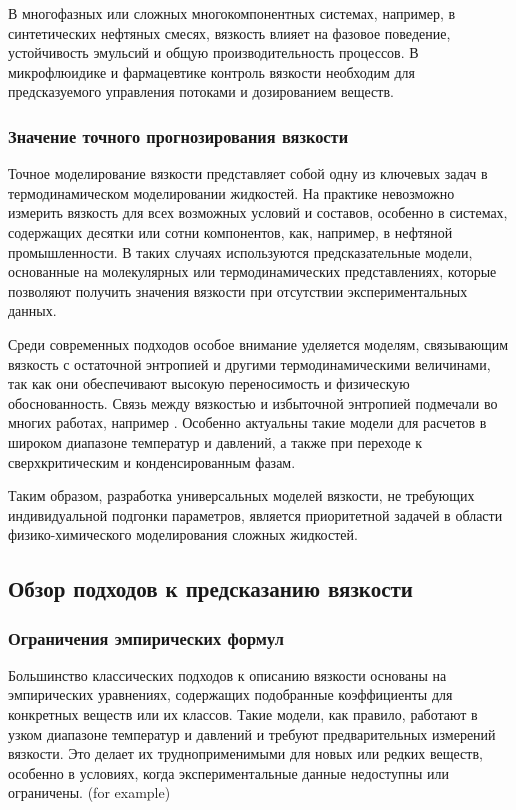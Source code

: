 \documentclass[a4paper,12pt]{article}
\begin{document}
В многофазных или сложных многокомпонентных системах, например, в синтетических нефтяных смесях, вязкость влияет на фазовое поведение, устойчивость эмульсий и общую производительность процессов. В микрофлюидике и фармацевтике контроль вязкости необходим для предсказуемого управления потоками и дозированием веществ.

    \subsubsection{Значение точного прогнозирования вязкости}

Точное моделирование вязкости представляет собой одну из ключевых задач в термодинамическом моделировании жидкостей. На практике невозможно измерить вязкость для всех возможных условий и составов, особенно в системах, содержащих десятки или сотни компонентов, как, например, в нефтяной промышленности. В таких случаях используются предсказательные модели, основанные на молекулярных или термодинамических представлениях, которые позволяют получить значения вязкости при отсутствии экспериментальных данных.

Среди современных подходов особое внимание уделяется моделям, связывающим вязкость с остаточной энтропией и другими термодинамическими величинами, так как они обеспечивают высокую переносимость и физическую обоснованность. Связь между вязкостью и избыточной энтропией подмечали во многих работах, например \cite{taib2020residual}. Особенно актуальны такие модели для расчетов в широком диапазоне температур и давлений, а также при переходе к сверхкритическим и конденсированным фазам.

Таким образом, разработка универсальных моделей вязкости, не требующих индивидуальной подгонки параметров, является приоритетной задачей в области физико-химического моделирования сложных жидкостей.

  \subsection{Обзор подходов к предсказанию вязкости}

    \subsubsection{Ограничения эмпирических формул}
      Большинство классических подходов к описанию вязкости основаны на эмпирических уравнениях, содержащих подобранные коэффициенты для конкретных веществ или их классов. Такие модели, как правило, работают в узком диапазоне температур и давлений и требуют предварительных измерений вязкости. Это делает их трудноприменимыми для новых или редких веществ, особенно в условиях, когда экспериментальные данные недоступны или ограничены. (for example)
\end{document}

